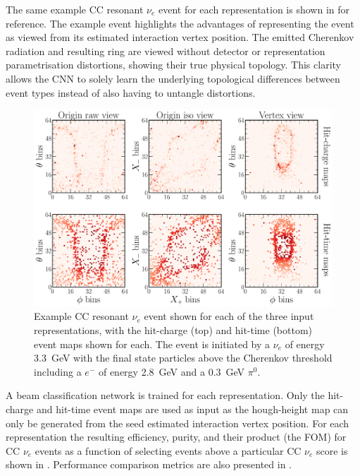 The same example CC resonant $\nu_{e}$ event for each representation is shown in
 for reference. The example event highlights the
advantages of representing the event as viewed from its estimated interaction vertex position. The
emitted Cherenkov radiation and resulting ring are viewed without detector or representation
parametrisation distortions, showing their true physical topology. This clarity allows the CNN to
solely learn the underlying topological differences between event types instead of also having to
untangle distortions.

\begin{figure} %
    \includegraphics[width=\textwidth]{diagrams/7-results/explore_repr_nuel_ccres_event.pdf}
    \caption[Example CC resonant $\nu_{e}$ event shown for different input representations]
    {Example CC resonant $\nu_{e}$ event shown for each of the three input representations, with
        the hit-charge (top) and hit-time (bottom) event maps shown for each. The event is
        initiated by a $\nu_{e}$ of energy \SI{3.3}{\GeV} with the final state particles above the
        Cherenkov threshold including a $e^{-}$ of energy \SI{2.8}{\GeV} and a \SI{0.3}{\GeV}
        $\pi^{0}$.}
    \label{fig:explore_repr_nuel_ccres_event}
\end{figure}


A beam classification network is trained for each representation. Only the hit-charge and hit-time
event maps are used as input as the hough-height map can only be generated from the seed estimated
interaction vertex position. For each representation the resulting efficiency, purity, and their
product (the FOM) for CC $\nu_{e}$ events as a function of selecting events above a particular CC
$\nu_{e}$ score is shown in . Performance comparison metrics
are also presented in .

